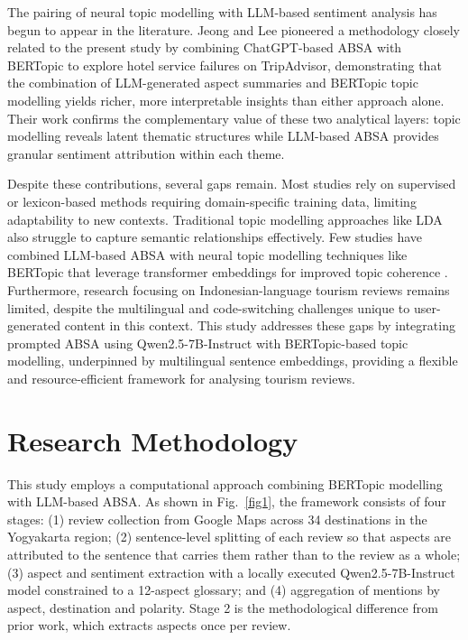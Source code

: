 \documentclass[pdflatex,sn-mathphys-num]{sn-jnl}
\begin{document}
The pairing of neural topic modelling with LLM-based sentiment analysis has begun to appear in the literature. Jeong and Lee \cite{bib21} pioneered a methodology closely related to the present study by combining ChatGPT-based ABSA with BERTopic to explore hotel service failures on TripAdvisor, demonstrating that the combination of LLM-generated aspect summaries and BERTopic topic modelling yields richer, more interpretable insights than either approach alone. Their work confirms the complementary value of these two analytical layers: topic modelling reveals latent thematic structures while LLM-based ABSA provides granular sentiment attribution within each theme.

Despite these contributions, several gaps remain. Most studies rely on supervised or lexicon-based methods requiring domain-specific training data, limiting adaptability to new contexts. Traditional topic modelling approaches like LDA also struggle to capture semantic relationships effectively. Few studies have combined LLM-based ABSA with neural topic modelling techniques like BERTopic that leverage transformer embeddings for improved topic coherence \cite{bib22}. Furthermore, research focusing on Indonesian-language tourism reviews remains limited, despite the multilingual and code-switching challenges unique to user-generated content in this context. This study addresses these gaps by integrating prompted ABSA using Qwen2.5-7B-Instruct with BERTopic-based topic modelling, underpinned by multilingual sentence embeddings, providing a flexible and resource-efficient framework for analysing tourism reviews.

\section{Research Methodology}\label{sec3}

This study employs a computational approach combining BERTopic modelling with LLM-based ABSA. As shown in Fig.~\ref{fig1}, the framework consists of four stages: (1) review collection from Google Maps across 34 destinations in the Yogyakarta region; (2) sentence-level splitting of each review so that aspects are attributed to the sentence that carries them rather than to the review as a whole; (3) aspect and sentiment extraction with a locally executed Qwen2.5-7B-Instruct model constrained to a 12-aspect glossary; and (4) aggregation of mentions by aspect, destination and polarity. Stage 2 is the methodological difference from prior work, which extracts aspects once per review.
\end{document}
